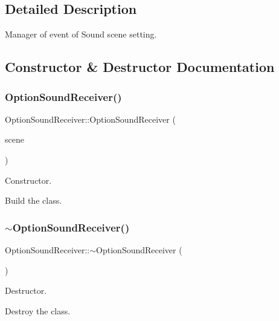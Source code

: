 \subsection{Detailed Description}
Manager of event of Sound scene setting. 

\subsection{Constructor \& Destructor Documentation}
\mbox{\label{classOptionSoundReceiver_aac72bf7db0c7610a37f9f14984f087ef}} 
\subsubsection{\texorpdfstring{Option\+Sound\+Receiver()}{OptionSoundReceiver()}}
{\footnotesize\ttfamily Option\+Sound\+Receiver\+::\+Option\+Sound\+Receiver (\begin{DoxyParamCaption}\item[{\hyperlink{classOptionSoundScene}{Option\+Sound\+Scene} $\ast$}]{scene }\end{DoxyParamCaption})}



Constructor. 

Build the class. \mbox{\label{classOptionSoundReceiver_aca3553e7a1777ed7e39111325b09954a}} 
\subsubsection{\texorpdfstring{$\sim$\+Option\+Sound\+Receiver()}{~OptionSoundReceiver()}}
{\footnotesize\ttfamily Option\+Sound\+Receiver\+::$\sim$\+Option\+Sound\+Receiver (\begin{DoxyParamCaption}{ }\end{DoxyParamCaption})}



Destructor. 

Destroy the class. 

